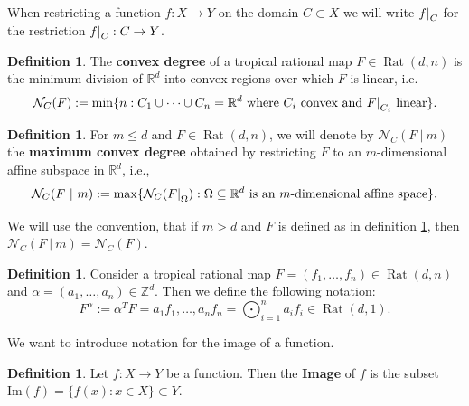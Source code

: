 \documentclass{article}
\theoremstyle{definition}
\newtheorem{definition}[theorem]{Definition}
\DeclareMathOperator{\Rat}{Rat}
\newcommand\restr[2]{{%
  \left.\kern-\nulldelimiterspace %
  #1 %
  \right|_{#2} %
  }}
\begin{document}
When restricting a function $f: X \to Y$ on the domain $C \subset X$ we will write $\restr{f}{C}$ for the restriction $\restr{f}{C} : C \to Y$.

\begin{definition}\hspace{1sp}\cite[p.~15]{zhang2018tropical}
The \textbf{convex degree} of a tropical rational map $F \in \Rat(d,n)$ is the minimum division of $\mathbb{R}^{d}$ into convex
regions over which $F$ is linear, i.e.
$$\mathcal{N}_{C}(F) := \min\{n:C_1 \cup \dots \cup C_n = \mathbb{R}^{d} \ \text{where} \ C_i \ \text{convex and} \ \restr{F}{C_i} \ \text{linear}\}.$$
\end{definition}

\begin{definition}\hspace{1sp}\cite{zhang2018tropical}\label{def:conv_deg_restr}
For $m \leq d$ and $F \in \Rat(d,n)$, we will denote by $\mathcal{N}_{C}(F \ | \ m)$ the \textbf{maximum convex degree} obtained by restricting $F$ to an $m$-dimensional affine subspace in $\mathbb{R}^{d}$, i.e.,
$$\mathcal{N}_C(F \ | \ m) := \max \{ \mathcal{N}_C(\restr{F}{\Omega}): \Omega \subseteq \mathbb{R}^{d} \ \text{is an} \ m \text{-dimensional affine space} \}.$$
\end{definition}

We will use the convention, that if $m > d$ and $F$ is defined as in definition \ref{def:conv_deg_restr}, then $\mathcal{N}_C(F \ | \ m) = \mathcal{N}_C(F)$.

\begin{definition}\hspace{1sp}\cite{zhang2018tropical}
Consider a tropical rational map $F=(f_1, \dots , f_n) \in \Rat(d, n)$ and $\alpha = (a_1, \dots , a_n) \in \mathbb{Z}^{d}$. Then we define the following notation:
$$F^{\alpha} := \alpha^{T} F = a_1 f_1 , \dots , a_n f_n = \displaystyle\bigodot_{i=1}^{n} a_i f_i \in \Rat(d, 1).$$
\end{definition}

We want to introduce notation for the image of a function.

\begin{definition}
Let $f: X \to Y$ be a function. Then the \textbf{Image} of $f$ is the subset $\text{Im}(f) = \{f(x) : x \in X\} \subset Y$.
\end{definition}
\end{document}
